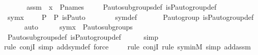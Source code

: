 \begin{isabellebody}
%
\isadelimproof
%
\endisadelimproof
%
\isatagproof
{}\isamarkupfalse%
\ {\isacharminus}{\kern0pt}\ \isanewline
\ \ \isamarkupfalse%
\ assm\ {\isacharcolon}{\kern0pt}\ {\isachardoublequoteopen}x\ {\isasymin}\ P{\isacharunderscore}{\kern0pt}names{\isachardoublequoteclose}\ \isanewline
\ \ \isamarkupfalse%
\ P{\isacharunderscore}{\kern0pt}auto{\isacharunderscore}{\kern0pt}subgroups{\isacharunderscore}{\kern0pt}def\ is{\isacharunderscore}{\kern0pt}P{\isacharunderscore}{\kern0pt}auto{\isacharunderscore}{\kern0pt}group{\isacharunderscore}{\kern0pt}def\isanewline
\isanewline
\ \ \isamarkupfalse%
\ {\isachardoublequoteopen}sym{\isacharparenleft}{\kern0pt}x{\isacharparenright}{\kern0pt}\ {\isasymsubseteq}\ {\isacharbraceleft}{\kern0pt}\ {\isasympi}\ {\isasymin}\ P\ {\isasymrightarrow}\ P{\isachardot}{\kern0pt}\ is{\isacharunderscore}{\kern0pt}P{\isacharunderscore}{\kern0pt}auto{\isacharparenleft}{\kern0pt}{\isasympi}{\isacharparenright}{\kern0pt}\ {\isacharbraceright}{\kern0pt}{\isachardoublequoteclose}\ \isanewline
\ \ \ \ \isamarkupfalse%
\ sym{\isacharunderscore}{\kern0pt}def\ \isanewline
\ \ \ \ \isamarkupfalse%
\ {\isasymG}{\isacharunderscore}{\kern0pt}P{\isacharunderscore}{\kern0pt}auto{\isacharunderscore}{\kern0pt}group\ is{\isacharunderscore}{\kern0pt}P{\isacharunderscore}{\kern0pt}auto{\isacharunderscore}{\kern0pt}group{\isacharunderscore}{\kern0pt}def\ \isanewline
\ \ \ \ \isamarkupfalse%
\ auto\isanewline
\isanewline
\ \ \isamarkupfalse%
\ \isamarkupfalse%
\ {\isachardoublequoteopen}sym{\isacharparenleft}{\kern0pt}x{\isacharparenright}{\kern0pt}\ {\isasymin}\ P{\isacharunderscore}{\kern0pt}auto{\isacharunderscore}{\kern0pt}subgroups{\isacharparenleft}{\kern0pt}{\isasymG}{\isacharparenright}{\kern0pt}{\isachardoublequoteclose}\ \isanewline
\ \ \ \ \isamarkupfalse%
\ P{\isacharunderscore}{\kern0pt}auto{\isacharunderscore}{\kern0pt}subgroups{\isacharunderscore}{\kern0pt}def\ is{\isacharunderscore}{\kern0pt}P{\isacharunderscore}{\kern0pt}auto{\isacharunderscore}{\kern0pt}group{\isacharunderscore}{\kern0pt}def\isanewline
\ \ \ \ \isamarkupfalse%
\ simp\ \isanewline
\ \ \ \ \isamarkupfalse%
{\isacharparenleft}{\kern0pt}rule\ conjI{\isacharcomma}{\kern0pt}\ simp\ add{\isacharcolon}{\kern0pt}sym{\isacharunderscore}{\kern0pt}def{\isacharcomma}{\kern0pt}\ force{\isacharparenright}{\kern0pt}\isanewline
\ \ \ \ \isamarkupfalse%
{\isacharparenleft}{\kern0pt}rule\ conjI{\isacharcomma}{\kern0pt}\ rule\ sym{\isacharunderscore}{\kern0pt}in{\isacharunderscore}{\kern0pt}M{\isacharcomma}{\kern0pt}\ simp\ add{\isacharcolon}{\kern0pt}assm{\isacharparenright}{\kern0pt}\isanewline

\end{isabellebody}

